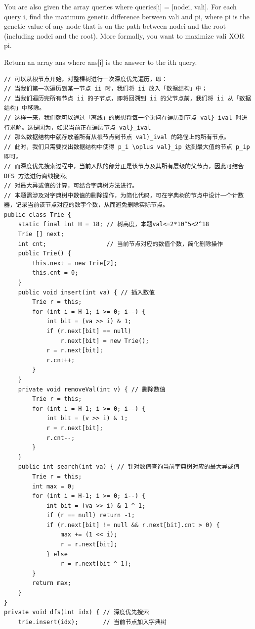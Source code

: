 \documentclass[9pt, b5paaper]{book}
\begin{document}
You are also given the array queries where queries[i] = [nodei, vali]. For each query i, find the maximum genetic difference between vali and pi, where pi is the genetic value of any node that is on the path between nodei and the root (including nodei and the root). More formally, you want to maximize vali XOR pi.

Return an array ans where ans[i] is the answer to the ith query.
\begin{verbatim}
// 可以从根节点开始，对整棵树进行一次深度优先遍历，即：
// 当我们第一次遍历到某一节点 ii 时，我们将 ii 放入「数据结构」中；
// 当我们遍历完所有节点 ii 的子节点，即将回溯到 ii 的父节点前，我们将 ii 从「数据结构」中移除。
// 这样一来，我们就可以通过「离线」的思想将每一个询问在遍历到节点 val}_ival 时进行求解。这是因为，如果当前正在遍历节点 val}_ival
// 那么数据结构中就存放着所有从根节点到节点 val}_ival 的路径上的所有节点。
// 此时，我们只需要找出数据结构中使得 p_i \oplus val}_ip 达到最大值的节点 p_ip 即可。
// 而深度优先搜索过程中，当前入队的部分正是该节点及其所有层级的父节点，因此可结合 DFS 方法进行离线搜索。
// 对最大异或值的计算，可结合字典树方法进行。
// 本题需涉及对字典树中数值的删除操作，为简化代码，可在字典树的节点中设计一个计数器，记录当前该节点对应的数字个数，从而避免删除实际节点。
public class Trie {
    static final int H = 18; // 树高度，本题val<=2*10^5<2^18
    Trie [] next;
    int cnt;                 // 当前节点对应的数值个数，简化删除操作
    public Trie() {
        this.next = new Trie[2];
        this.cnt = 0;
    }
    public void insert(int va) { // 插入数值
        Trie r = this;
        for (int i = H-1; i >= 0; i--) {
            int bit = (va >> i) & 1;
            if (r.next[bit] == null) 
                r.next[bit] = new Trie();
            r = r.next[bit];
            r.cnt++;
        }
    }
    private void removeVal(int v) { // 删除数值
        Trie r = this;
        for (int i = H-1; i >= 0; i--) {
            int bit = (v >> i) & 1;
            r = r.next[bit];
            r.cnt--;
        }
    }
    public int search(int va) { // 针对数值查询当前字典树对应的最大异或值
        Trie r = this;
        int max = 0;
        for (int i = H-1; i >= 0; i--) {
            int bit = (va >> i) & 1 ^ 1;
            if (r == null) return -1;
            if (r.next[bit] != null && r.next[bit].cnt > 0) {
                max += (1 << i);
                r = r.next[bit];
            } else
                r = r.next[bit ^ 1];
        }
        return max;
    }
}
private void dfs(int idx) { // 深度优先搜索
    trie.insert(idx);       // 当前节点加入字典树

\end{verbatim}
\end{document}
